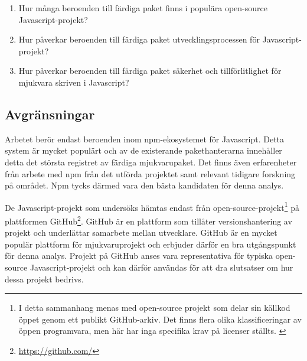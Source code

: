 \begin{enumerate}
  \item\label{joel_o-fs:1} Hur många beroenden till färdiga paket finns i populära open-source Javascript-projekt?

  \item\label{joel_o-fs:2} Hur påverkar beroenden till färdiga paket utvecklingsprocessen för Javascript-projekt?

  \item\label{joel_o-fs:3} Hur påverkar beroenden till färdiga paket säkerhet och tillförlitlighet för mjukvara skriven i Javascript?
\end{enumerate}

\subsection{Avgränsningar}
\label{subsec:joel_o-delimitations}
Arbetet berör endast beroenden inom npm-ekosystemet för Javascript. Detta system är mycket populärt och av de existerande pakethanterarna innehåller detta det största registret av färdiga mjukvarupaket.\cite{Decan2018} Det finns även erfarenheter från arbete med npm från det utförda projektet samt relevant tidigare forskning på området. Npm tycks därmed vara den bästa kandidaten för denna analys.

De Javascript-projekt som undersöks hämtas endast från open-source-projekt\footnote{I detta sammanhang menas med open-source projekt som delar sin källkod öppet genom ett publikt GitHub-arkiv. Det finns flera olika klassificeringar av öppen programvara, men här har inga specifika krav på licenser ställts. \cite{what-is-open-source}} på plattformen GitHub\footnote{\url{https://github.com/}}. GitHub är en plattform som tillåter versionshantering av projekt och underlättar samarbete mellan utvecklare. GitHub är en mycket populär plattform för mjukvaruprojekt och erbjuder därför en bra utgångspunkt för denna analys. Projekt på GitHub anses vara representativa för typiska open-source Javascript-projekt och kan därför användas för att dra slutsatser om hur dessa projekt bedrivs.
